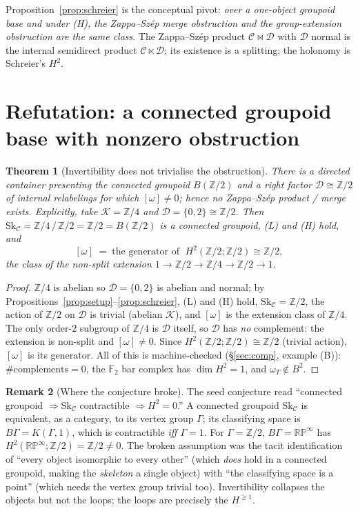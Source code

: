 \documentclass[11pt]{article}
\newtheorem{theorem}{Theorem}
\theoremstyle{definition}
\newtheorem{remark}[theorem]{Remark}
\newcommand{\C}{\mathcal{C}}
\newcommand{\D}{\mathcal{D}}
\newcommand{\K}{\mathcal{K}}
\newcommand{\Sk}{\mathrm{Sk}}
\newcommand{\Z}{\mathbb{Z}}
\begin{document}
Proposition~\ref{prop:schreier} is the conceptual pivot: \emph{over a one-object
groupoid base and under \textnormal{(H)}, the Zappa--Sz\'ep merge obstruction and
the group-extension obstruction are the same class}. The Zappa--Sz\'ep product
$\C\bowtie\D$ with $\D$ normal is the internal semidirect product $\C\ltimes\D$;
its existence is a splitting; the holonomy is Schreier's $H^2$.

\section{Refutation: a connected groupoid base with nonzero obstruction}
\label{sec:refute}

\begin{theorem}[Invertibility does not trivialise the obstruction]\label{thm:refute}
There is a directed container presenting the connected groupoid $B(\Z/2)$ and a
right factor $\D\cong\Z/2$ of internal relabelings for which $[\omega]\neq0$; hence
no Zappa--Sz\'ep product / merge exists. Explicitly, take $\K=\Z/4$ and
$\D=\{0,2\}\cong\Z/2$. Then $\Sk_\C=\Z/4\,/\,\Z/2=\Z/2=B(\Z/2)$ is a connected
groupoid, \textnormal{(L)} and \textnormal{(H)} hold, and
\[
   [\omega]\;=\;\text{the generator of }\;H^2(\Z/2;\Z/2)\cong\Z/2 ,
\]
the class of the non-split extension $1\to\Z/2\to\Z/4\to\Z/2\to1$.
\end{theorem}
\begin{proof}
$\Z/4$ is abelian so $\D=\{0,2\}$ is abelian and normal; by
Propositions~\ref{prop:setup}--\ref{prop:schreier}, \textnormal{(L)} and
\textnormal{(H)} hold, $\Sk_\C=\Z/2$, the action of $\Z/2$ on $\D$ is trivial
(abelian $\K$), and $[\omega]$ is the extension class of $\Z/4$. The only order-$2$
subgroup of $\Z/4$ is $\D$ itself, so $\D$ has \emph{no} complement: the extension
is non-split and $[\omega]\neq0$. Since $H^2(\Z/2;\Z/2)\cong\Z/2$ (trivial action),
$[\omega]$ is its generator. All of this is machine-checked
(\S\ref{sec:comp}, example (B)): $\#\text{complements}=0$, the $\mathbb F_2$ bar
complex has $\dim H^2=1$, and $\omega_T\notin B^2$.
\end{proof}

\begin{remark}[Where the conjecture broke]\label{rem:broke}
The seed conjecture read ``connected groupoid $\Rightarrow\Sk_\C$ contractible
$\Rightarrow H^2=0$.'' A connected groupoid $\Sk_\C$ is equivalent, as a category,
to its vertex group $\Gamma$; its classifying space is $B\Gamma=K(\Gamma,1)$, which
is contractible \emph{iff $\Gamma=1$}. For $\Gamma=\Z/2$, $B\Gamma=\mathbb{RP}^\infty$
has $H^2(\mathbb{RP}^\infty;\Z/2)=\Z/2\neq0$. The broken assumption was the tacit
identification of ``every object isomorphic to every other'' (which \emph{does}
hold in a connected groupoid, making the \emph{skeleton} a single object) with
``the classifying space is a point'' (which needs the vertex group trivial too).
Invertibility collapses the objects but not the loops; the loops are precisely the
$H^{\ge1}$.
\end{remark}
\end{document}
